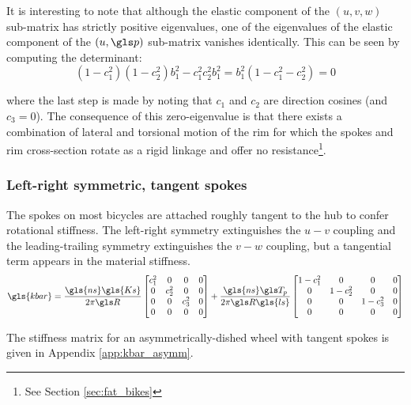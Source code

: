 \documentclass[\rootdir/thesis.tex]{subfiles}
\begin{document}
It is interesting to note that although the elastic component of the $(u,v,w)$ sub-matrix has strictly positive eigenvalues, one of the eigenvalues of the elastic component of the $(u,\p)$ sub-matrix vanishes identically. This can be seen by computing the determinant:
\begin{equation}
(1-c_1^2)(1-c_2^2)b_1^2 - c_1^2c_2^2b_1^2 = b_1^2(1 - c_1^2 - c_2^2) = 0
\end{equation}

where the last step is made by noting that $c_1$ and $c_2$ are direction cosines (and $c_3=0$). The consequence of this zero-eigenvalue is that there exists a combination of lateral and torsional motion of the rim for which the spokes and rim cross-section rotate as a rigid linkage and offer no resistance\footnote{See Section \ref{sec:fat_bikes}}.

\subsubsection*{Left-right symmetric, tangent spokes}
The spokes on most bicycles are attached roughly tangent to the hub to confer rotational stiffness. The left-right symmetry extinguishes the $u-v$ coupling and the leading-trailing symmetry extinguishes the $v-w$ coupling, but a tangential term appears in the material stiffness.
\begin{equation}
\label{eq:kbar_symm_ncross}
\gls{kbar} = \frac{\gls{ns} \gls{Ks}}{2\pi \R}
\begin{bmatrix}
c_1^2     & 0     & 0 & 0\\
0 & c_2^2 & 0     & 0\\
0 & 0     & c_3^2 & 0\\
0 & 0     & 0     & 0
\end{bmatrix} +
\frac{\gls{ns} \T_p}{2\pi \R \gls{ls}}
\begin{bmatrix}
1-c_1^2 & 0       & 0       & 0\\
0       & 1-c_2^2 & 0       & 0\\
0       & 0       & 1-c_3^2 & 0\\
0       & 0       & 0       & 0
\end{bmatrix}
\end{equation}

The stiffness matrix for an asymmetrically-dished wheel with tangent spokes is given in Appendix \ref{app:kbar_asymm}.
\end{document}
